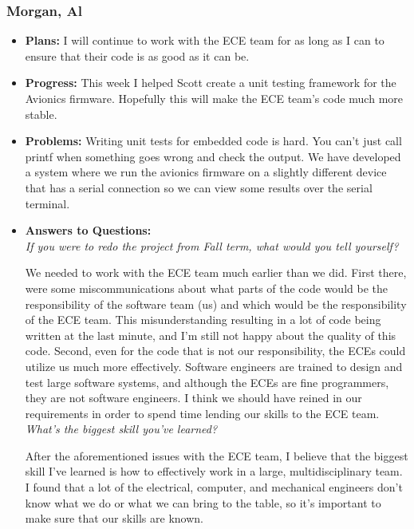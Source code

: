 \documentclass[10pt,draftclsnofoot,onecolumn]{IEEEtran}
\begin{document}
\subsubsection{Morgan, Al}
\begin{itemize}
	\item \textbf{Plans: }
	I will continue to work with the ECE team for as long as I can to ensure that their code is as good as it can be.
	\item \textbf{Progress: }
	This week I helped Scott create a unit testing framework for the Avionics firmware. Hopefully this will make the ECE team's code much more stable.
	\item \textbf{Problems: }
	Writing unit tests for embedded code is hard. You can't just call printf when something goes wrong and check the output. We have developed a system where we run the avionics firmware on a slightly different device that has a serial connection so we can view some results over the serial terminal.
	\item\textbf{Answers to Questions: }\\
	\textit{If you were to redo the project from Fall term, what would you tell yourself?}

	We needed to work with the ECE team much earlier than we did. First there, were some miscommunications about what parts of the code would be the responsibility of the software team (us) and which would be the responsibility of the ECE team. This misunderstanding resulting in a lot of code being written at the last minute, and I'm still not happy about the quality of this code. Second, even for the code that is not our responsibility, the ECEs could utilize us much more effectively. Software engineers are trained to design and test large software systems, and although the ECEs are fine programmers, they are not software engineers. I think we should have reined in our requirements in order to spend time lending our skills to the ECE team.\\

	\textit{What's the biggest skill you've learned?}

	After the aforementioned issues with the ECE team, I believe that the biggest skill I've learned is how to effectively work in a large, multidisciplinary team. I found that a lot of the electrical, computer, and mechanical engineers don't know what we do or what we can bring to the table, so it's important to make sure that our skills are known.\\


\end{itemize}
\end{document}
